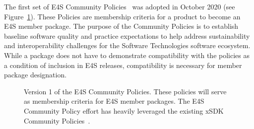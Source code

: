 The first set of E4S Community Policies~\cite{e4s:policies} was adopted in October 2020 (see Figure~\ref{fig:E4S-Community-Policies-V1}). These Policies are membership criteria for a product to become an E4S member package. The purpose of the Community Policies is to establish baseline software quality and practice expectations to help address sustainability and interoperability challenges for the Software Technologies software ecosystem. While a package does not have to demonstrate compatibility with the policies as a condition of inclusion in E4S releases, compatibility is necessary for member package designation.

\begin{figure}
        \centering
        \caption{Version 1 of the E4S Community Policies. These policies will serve as membership criteria for E4S member packages. The E4S Community Policy effort has heavily leveraged the existing xSDK Community Policies~\cite{xsdk-policies:homepage}.}
        \label{fig:E4S-Community-Policies-V1}
\end{figure}


